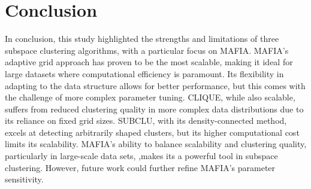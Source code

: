 \section{Conclusion}
In conclusion, this study highlighted the strengths and limitations of three subspace clustering algorithms, with a particular focus on MAFIA. MAFIA's adaptive grid approach has proven to be the most scalable, making it ideal for large datasets where computational efficiency is paramount. Its flexibility in adapting to the data structure allows for better performance, but this comes with the challenge of more complex parameter tuning. CLIQUE, while also scalable, suffers from reduced clustering quality in more complex data distributions due to its reliance on fixed grid sizes. SUBCLU, with its density-connected method, excels at detecting arbitrarily shaped clusters, but its higher computational cost limits its scalability. MAFIA's ability to balance scalability and clustering quality, particularly in large-scale data sets, ,makes its a powerful tool in subspace clustering. However, future work could further refine MAFIA's parameter sensitivity.